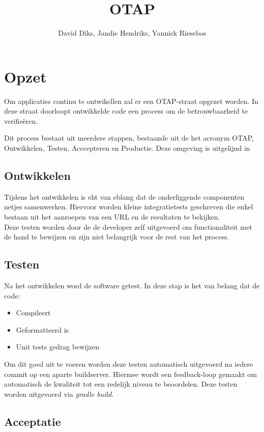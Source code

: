\documentclass[12pt,a4paper]{scrreprt}
\title{OTAP}
\author{David Diks, Jandie Hendriks, Yannick Riesebos}
\begin{document}
	\maketitle
	
	\chapter{Opzet}
	Om applicaties continu te ontwikellen zal er een OTAP-straat opgezet worden. In deze straat doorloopt ontwikkelde code een process om de betrouwbaarheid te verifie\"eren.
	
	Dit process bestaat uit meerdere stappen, bestaande uit de het acronym OTAP, Ontwikkelen, Testen, Acccepteren en Productie. Deze omgeving is uitgelijnd in 
	
	\section{Ontwikkelen}
	
	Tijdens het ontwikkelen is eht van eblang dat de onderliggende componenten netjes samenwerken. Hiervoor worden kleine integratietests geschreven die enkel bestaan uit het aanroepen van een URL en de resultaten te bekijken. \\
	
	Deze testen worden door de de developer zelf uitgevoerd om functionaliteit met de hand te bewijzen en zijn niet belangrijk voor de rest van het process.
	
	\section{Testen}
	
	Na het ontwikkelen word de software getest. In deze stap is het van belang dat de code:
	
	\begin{itemize}
		\item Compileert
		\item Geformatteerd is
		\item Unit tests gedrag bewijzen
	\end{itemize}
	
	Om dit goed uit te voeren worden deze testen automatisch uitgevoerd na iedere commit op een aparte buildserver. Hiermee wordt een feedback-loop gemaakt om automatisch de kwaliteit tot een redelijk niveau te beoordelen. Deze testen worden uitgevoerd via \textit{gradle build}.
	
	\section{Acceptatie}
	
\end{document}
